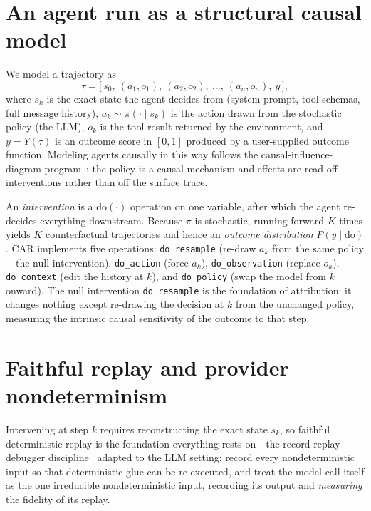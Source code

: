 \documentclass[11pt]{article}
\begin{document}
\section{An agent run as a structural causal model}
\label{sec:scm}

We model a trajectory as
\begin{equation}
\tau = \big[\, s_0,\ (a_1,o_1),\ (a_2,o_2),\ \dots,\ (a_n,o_n),\ y \,\big],
\end{equation}
where $s_k$ is the exact state the agent decides from (system prompt, tool schemas, full message
history), $a_k \sim \pi(\cdot \mid s_k)$ is the action drawn from the stochastic policy (the LLM),
$o_k$ is the tool result returned by the environment, and $y = Y(\tau)$ is an outcome score in
$[0,1]$ produced by a user-supplied outcome function. Modeling agents causally in this way follows
the causal-influence-diagram program~\cite{everitt2021,kenton2023}: the policy is a causal
mechanism and effects are read off interventions rather than off the surface trace.

An \emph{intervention} is a $\mathrm{do}(\cdot)$ operation on one variable, after which the agent
re-decides everything downstream. Because $\pi$ is stochastic, running forward $K$ times yields $K$
counterfactual trajectories and hence an \emph{outcome distribution} $P(y \mid \mathrm{do})$. CAR
implements five operations: \texttt{do\_resample} (re-draw $a_k$ from the same policy---the null
intervention), \texttt{do\_action} (force $a_k$), \texttt{do\_observation} (replace $o_k$),
\texttt{do\_context} (edit the history at $k$), and \texttt{do\_policy} (swap the model from $k$
onward). The null intervention \texttt{do\_resample} is the foundation of attribution: it changes
nothing except re-drawing the decision at $k$ from the unchanged policy, measuring the intrinsic
causal sensitivity of the outcome to that step.

\section{Faithful replay and provider nondeterminism}
\label{sec:replay}

Intervening at step $k$ requires reconstructing the exact state $s_k$, so faithful deterministic
replay is the foundation everything rests on---the record-replay debugger
discipline~\cite{rr2017} adapted to the LLM setting: record every nondeterministic input so that
deterministic glue can be re-executed, and treat the model call itself as the one irreducible
nondeterministic input, recording its output and \emph{measuring} the fidelity of its replay.
\end{document}
